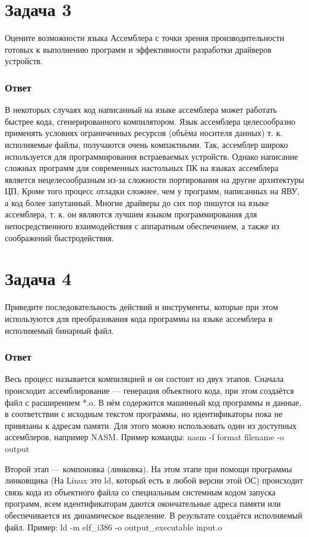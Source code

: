 \documentclass[12pt]{article}
\begin{document}
\section*{Задача 3}
Оцените возможности языка Ассемблера с точки зрения производительности
готовых к выполнению программ и эффективности разработки драйверов
устройств.
\subsubsection*{Ответ}
В некоторых случаях код написанный на языке ассемблера может работать быстрее кода,
сгенерированного компилятором. Язык ассемблера целесообразно применять условиях
ограниченных ресурсов (объёма носителя данных) т. к. исполняемые файлы, получаются очень
компактными. Так, ассемблер широко используется для программирования встраеваемых
устройств. Однако написание сложных программ для современных настольных ПК на языках
ассемблера является нецелесообразным из-за сложности портирования на другие архитектуры
ЦП, Кроме того процесс отладки сложнее, чем у программ, написанных на ЯВУ, а код более
запутанный.
Многие драйверы до сих пор пишутся на языке ассемблера, т. к. он являются лучшим языком
программирования для непосредственного взаимодействия с аппаратным обеспечением, а также
из соображений быстродействия.
\section*{Задача 4}
Приведите последовательность действий и инструменты, которые при этом используются
для преобразования кода программы на языке ассемблера в исполняемый бинарный файл.
\subsubsection*{Ответ}
Весь процесс называется компиляцией и он состоит из двух этапов. Сначала происходит
ассемблирование — генерация объектного кода, при этом создаётся файл с расширением *.o. В
нём содержится машинный код программы и данные, в соответствии с исходным текстом
программы, но идентификаторы пока не привязаны к адресам памяти. Для этого можно
использовать один из доступных ассемблеров, например NASM. Пример команды:
nasm -f format filename -o output

Второй этап — компоновка (линковка). На этом этапе при помощи программы линковщика (На
Linux это ld, который есть в любой версии этой ОС) происходит связь кода из объектного файла
со специальным системным кодом запуска программ, всем идентификаторам даются
окончательные адреса памяти или обеспечивается их динамическое выделение. В результате
создаётся исполняемый файл. Пример:
ld -m elf\_i386 -o output\_executable input.o
\end{document}

